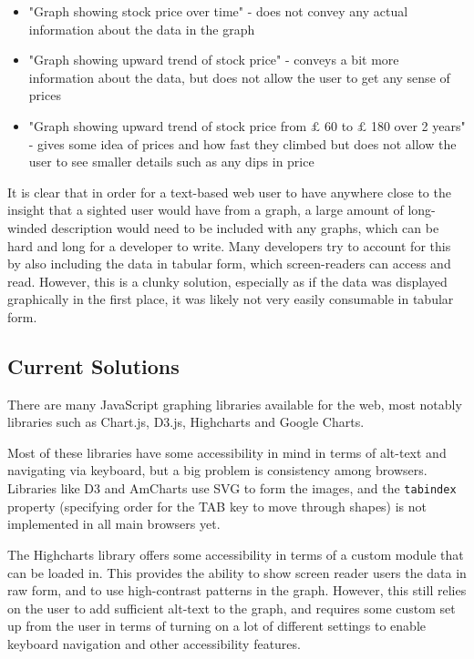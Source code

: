 \documentclass[ %
                    author={Aleena Baig},
                supervisor={Dr Simon Lock},
                    degree={BSc},
                     title={On Making Web Accessible Graphs},
                  subtitle={},
                      year={2019} ]{dissertation}
\begin{document}
\begin{itemize}
    \item "Graph showing stock price over time" - does not convey any actual information about the data in the graph
    \item "Graph showing upward trend of stock price" - conveys a bit more information about the data, but does not allow the user to get any sense of prices
    \item "Graph showing upward trend of stock price from $\pounds$ 60 to $\pounds$ 180 over 2 years" - gives some idea of prices and how fast they climbed but does not allow the user to see smaller details such as any dips in price
\end{itemize}
%
It is clear that in order for a text-based web user to have anywhere close to the insight that a sighted user would have from a graph, a large amount of long-winded description would need to be included with any graphs, which can be hard and long for a developer to write. Many developers try to account for this by also including the data in tabular form, which screen-readers can access and read. However, this is a clunky solution, especially as if the data was displayed graphically in the first place, it was likely not very easily consumable in tabular form.

\subsection{Current Solutions}

There are many JavaScript graphing libraries available for the web, most notably libraries such as Chart.js, D3.js, Highcharts and Google Charts.

Most of these libraries have some accessibility in mind in terms of alt-text and navigating via keyboard, but a big problem is consistency among browsers. Libraries like D3 and AmCharts use SVG to form the images, and the \texttt{tabindex} property (specifying order for the TAB key to move through shapes) is not implemented in all main browsers yet.

The Highcharts library offers some accessibility in terms of a custom module that can be loaded in. This provides the ability to show screen reader users the data in raw form, and to use high-contrast patterns in the graph. However, this still relies on the user to add sufficient alt-text to the graph, and requires some custom set up from the user in terms of turning on a lot of different settings to enable keyboard navigation and other accessibility features.
\end{document}
